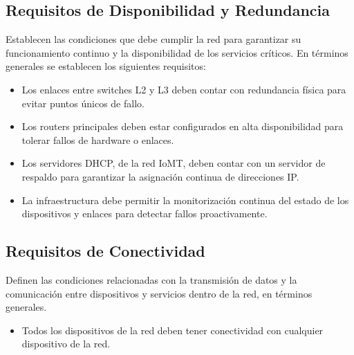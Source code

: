 \subsection{Requisitos de Disponibilidad y Redundancia}
Establecen las condiciones que debe cumplir la red para garantizar su funcionamiento continuo y la disponibilidad de los servicios críticos. En términos generales se establecen los siguientes requisitos:
\begin{itemize}
    \item Los enlaces entre switches L2 y L3 deben contar con redundancia física para evitar puntos únicos de fallo.
    \item Los routers principales deben estar configurados en alta disponibilidad para tolerar fallos de hardware o enlaces.
    \item Los servidores DHCP, de la red IoMT, deben contar con un servidor de respaldo para garantizar la asignación continua de direcciones IP.
    \item La infraestructura debe permitir la monitorización continua del estado de los dispositivos y enlaces para detectar fallos proactivamente.
\end{itemize}

\subsection{Requisitos de Conectividad}
Definen las condiciones relacionadas con la transmisión de datos y la comunicación entre dispositivos y servicios dentro de la red, en términos generales.
\begin{itemize}
    \item Todos los dispositivos de la red deben tener conectividad con cualquier dispositivo de la red.
\end{itemize}

